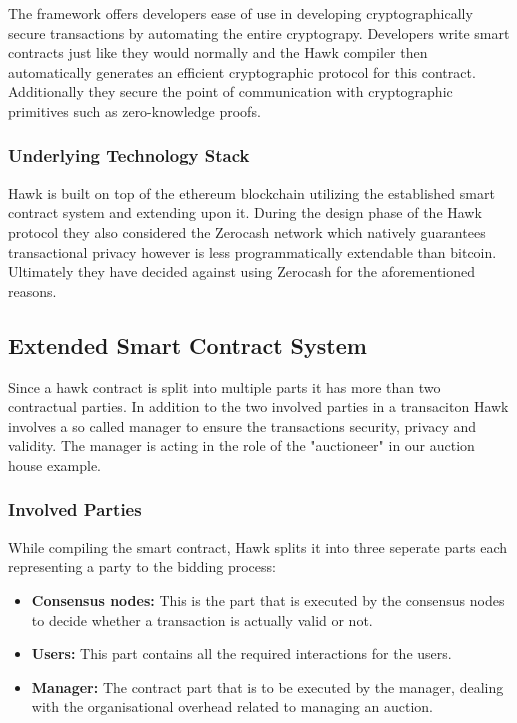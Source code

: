 The framework offers developers ease of use in developing cryptographically secure transactions by automating the entire cryptograpy. Developers write smart contracts just like they would normally and the Hawk compiler then automatically generates an efficient cryptographic protocol for this contract. Additionally they secure the point of communication with cryptographic primitives such as zero-knowledge proofs.\cite[p.839-840]{Hawk}

\subsubsection{Underlying Technology Stack}
Hawk is built on top of the ethereum blockchain utilizing the established smart contract system and extending upon it. During the design phase of the Hawk protocol they also considered the Zerocash network which natively guarantees transactional privacy however is less programmatically extendable than bitcoin. Ultimately they have decided against using Zerocash for the aforementioned reasons.\cite[p.841]{Hawk}

\subsection{Extended Smart Contract System}
Since a hawk contract is split into multiple parts it has more than two contractual parties. In addition to the two involved parties in a transaciton Hawk involves a so called manager to ensure the transactions security, privacy and validity. The manager is acting in the role of the "auctioneer" in our auction house example. 

\subsubsection{Involved Parties}
While compiling the smart contract, Hawk splits it into three seperate parts each representing a party to the bidding process:\cite[p.840]{Hawk}
\begin{itemize}
\item \textbf{Consensus nodes:}
This is the part that is executed by the consensus nodes to decide whether a transaction is actually valid or not.
\item \textbf{Users:}
This part contains all the required interactions for the users.
\item \textbf{Manager:}
The contract part that is to be executed by the manager, dealing with the organisational overhead related to managing an auction.
\end{itemize}

